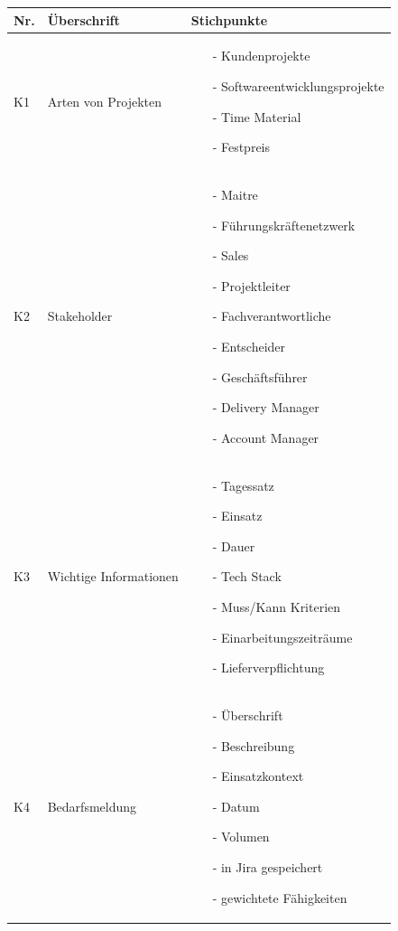 \begin{longtable}{| p{0.5cm} | p{4cm} | p{8.5cm} |}
	\hline
	Nr. & Überschrift & Stichpunkte\\
	\hline
	\hline
	K1 & Arten von Projekten & \begin{itemize}
		\item[-] Kundenprojekte
		\item[-] Softwareentwicklungsprojekte
		\item[-] Time Material
		\item[-] Festpreis
	\end{itemize}\\
	\hline
	K2 & Stakeholder & \begin{itemize}
		\item[-] Maitre
		\item[-] Führungskräftenetzwerk
		\item[-] Sales
		\item[-] Projektleiter
		\item[-] Fachverantwortliche
		\item[-] Entscheider
		\item[-] Geschäftsführer
		\item[-] Delivery Manager
		\item[-] Account Manager
	\end{itemize}\\
	\hline
	K3 & Wichtige Informationen & \begin{itemize}
		\item[-] Tagessatz
		\item[-] Einsatz
		\item[-] Dauer
		\item[-] Tech Stack
		\item[-] Muss/Kann Kriterien
		\item[-] Einarbeitungszeiträume
		\item[-] Lieferverpflichtung
	\end{itemize}\\
	\hline
	K4 & Bedarfsmeldung & \begin{itemize}
		\item[-] Überschrift
		\item[-] Beschreibung
		\item[-] Einsatzkontext
		\item[-] Datum
		\item[-] Volumen
		\item[-] in Jira gespeichert
		\item[-] gewichtete Fähigkeiten

\end{itemize}
\end{longtable}
